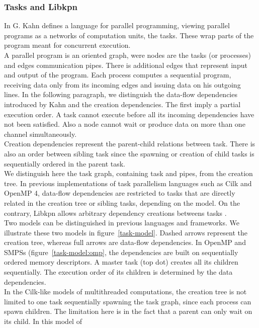 \documentclass[a4paper,11pt]{article}
\begin{document}
\subsubsection{Tasks and Libkpn}
In \cite{kahn_semantics_1974} G. Kahn defines a language for parallel programming, viewing 
parallel programs as a networks of computation units, the tasks. These wrap parts of the 
program meant for concurrent execution. \\
A parallel program is an oriented graph, were nodes are the tasks (or processes) and
edges communication pipes. There is additional edges that represent input and output
of the program. Each process computes a sequential program, receiving data only from
its incoming edges and issuing data on his outgoing lines. In the following paragraph, we
distinguish the data-flow dependencies introduced by Kahn and the creation dependencies.
The first imply a partial execution order. A task cannot execute before all its incoming
dependencies have not been satisfied. Also a node cannot wait or produce data on more
than one channel simultaneously. \\
Creation dependencies represent the parent-child relations between task. There is also
an order between sibling task since the spawning or creation of child tasks is sequentially
ordered in the parent task. \\
We distinguish here the task graph, containing task and pipes, from the creation tree.
In previous implementations of task parallelism languages such as Cilk and OpenMP 4,
data-flow dependencies are restricted to tasks that are directly related in the creation
tree or sibling tasks, depending on the model. On the contrary, Libkpn allows arbitrary
dependency creations betweens tasks . \\
Two models can be distinguished in previous languages and frameworks. We illustrate
these two models in figure~\ref{task-model}. Dashed arrows represent the creation tree, whereas full
arrows are data-flow dependencies. In OpenMP and SMPSs (figure~\ref{task-model:omp}, the dependencies
are built on sequentially ordered memory descriptors. A master task (top dot) creates all
its children sequentially. The execution order of its children is determined by the data
dependencies. \\
In the Cilk-like models of multithreaded computations, the creation tree is not limited
to one task sequentially spawning the task graph, since each process can spawn children.
The limitation here is in the fact that a parent can only wait on its child. In this model of
\end{document}
